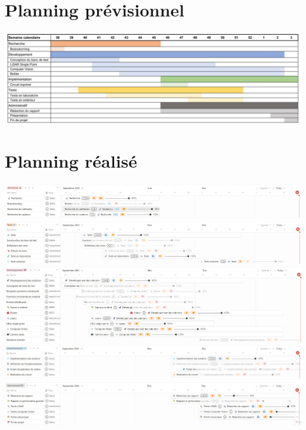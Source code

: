 \documentclass[11pt,titlepage]{report}
\begin{document}
\section{Planning prévisionnel}
\includegraphics[angle=90, height=0.75\textheight]{Images/business/planning/prevu.PNG}
\section{Planning réalisé}
\includegraphics[angle=90, height=0.95\textheight]{Images/business/planning/research.PNG}
\includegraphics[angle=90, height=0.95\textheight]{Images/business/planning/tests.PNG}
\includegraphics[angle=90, height=0.95\textheight]{Images/business/planning/dev.PNG}\newpage
\includegraphics[angle=90, height=0.95\textheight]{Images/business/planning/implementation.PNG}
\includegraphics[angle=90, height=0.95\textheight]{Images/business/planning/admin.PNG}
\end{document}
